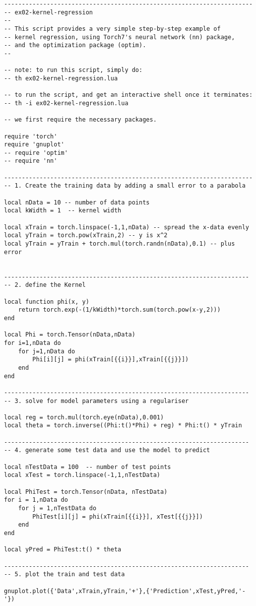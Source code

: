 \small
\begin{verbatim}
----------------------------------------------------------------------
-- ex02-kernel-regression
--
-- This script provides a very simple step-by-step example of
-- kernel regression, using Torch7's neural network (nn) package,
-- and the optimization package (optim).
--

-- note: to run this script, simply do:
-- th ex02-kernel-regression.lua

-- to run the script, and get an interactive shell once it terminates:
-- th -i ex02-kernel-regression.lua

-- we first require the necessary packages.

require 'torch'
require 'gnuplot'
-- require 'optim'
-- require 'nn'

----------------------------------------------------------------------
-- 1. Create the training data by adding a small error to a parabola

local nData = 10 -- number of data points
local kWidth = 1  -- kernel width

local xTrain = torch.linspace(-1,1,nData) -- spread the x-data evenly
local yTrain = torch.pow(xTrain,2) -- y is x^2
local yTrain = yTrain + torch.mul(torch.randn(nData),0.1) -- plus error


---------------------------------------------------------------------
-- 2. define the Kernel

local function phi(x, y)
    return torch.exp(-(1/kWidth)*torch.sum(torch.pow(x-y,2)))
end

local Phi = torch.Tensor(nData,nData)
for i=1,nData do
    for j=1,nData do
        Phi[i][j] = phi(xTrain[{{i}}],xTrain[{{j}}])
    end
end

---------------------------------------------------------------------
-- 3. solve for model parameters using a regulariser

local reg = torch.mul(torch.eye(nData),0.001)
local theta = torch.inverse((Phi:t()*Phi) + reg) * Phi:t() * yTrain

---------------------------------------------------------------------
-- 4. generate some test data and use the model to predict

local nTestData = 100  -- number of test points
local xTest = torch.linspace(-1,1,nTestData)

local PhiTest = torch.Tensor(nData, nTestData)
for i = 1,nData do
    for j = 1,nTestData do
        PhiTest[i][j] = phi(xTrain[{{i}}], xTest[{{j}}])
    end
end

local yPred = PhiTest:t() * theta

---------------------------------------------------------------------
-- 5. plot the train and test data

gnuplot.plot({'Data',xTrain,yTrain,'+'},{'Prediction',xTest,yPred,'-'})


\end{verbatim}
\clearpage

